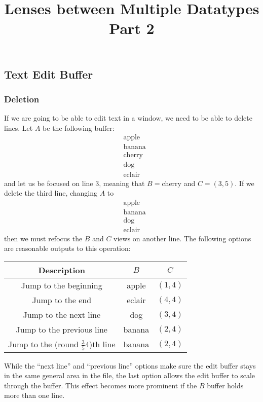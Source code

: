 \documentclass{article}
\title{Lenses between Multiple Datatypes Part 2}
\date{}
\begin{document}
\maketitle

\subsection{Text Edit Buffer}

\subsubsection*{Deletion}

If we are going to be able to edit text in a window, 
we need to be able to delete lines.
Let $A$ be the following buffer:
\begin{align*}
  &\text{apple} \\
  &\text{banana} \\
  &\text{cherry} \\
  &\text{dog} \\
  &\text{eclair}
\end{align*}
and let us be focused on line 3, meaning that $B = \text{cherry}$ and $C = (3,5)$.
If we delete the third line, changing $A$ to
\begin{align*}
  &\text{apple} \\
  &\text{banana} \\
  &\text{dog} \\
  &\text{eclair}
\end{align*}
then we must refocus the $B$ and $C$ views on another line. 
The following options are reasonable outputs to this operation:
\begin{center}\begin{tabular}{c c c}
  Description & $B$ & $C$ \\
  \hline
  Jump to the beginning & apple & $(1,4)$ \\
  Jump to the end & eclair & $(4,4)$ \\
  Jump to the next line & dog & $(3,4)$ \\
  Jump to the previous line & banana & $(2,4)$ \\
  Jump to the (round $\frac 3 5 4$)th line & banana & $(2,4)$
\end{tabular}\end{center}

While the ``next line'' and ``previous line'' options make sure
the edit buffer stays in the same general area in the file, the
last option allows the edit buffer to scale through the buffer.
This effect becomes more prominent if the $B$ buffer holds
more than one line. 
\end{document}
